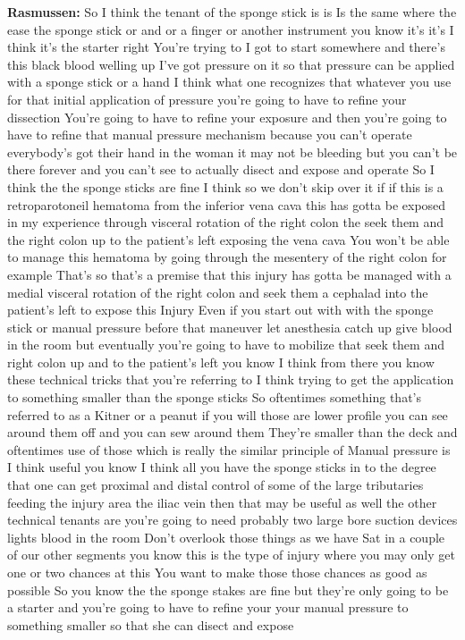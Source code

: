 \documentclass[
]{book}
\begin{document}
\textbf{Rasmussen:} So I think the tenant of the sponge stick is is Is the same where the ease the sponge stick or and or a finger or another instrument you know it's it's I think it's the starter right You're trying to I got to start somewhere and there's this black blood welling up I've got pressure on it so that pressure can be applied with a sponge stick or a hand I think what one recognizes that whatever you use for that initial application of pressure you're going to have to refine your dissection You're going to have to refine your exposure and then you're going to have to refine that manual pressure mechanism because you can't operate everybody's got their hand in the woman it may not be bleeding but you can't be there forever and you can't see to actually disect and expose and operate So I think the the sponge sticks are fine I think so we don't skip over it if if this is a retroparotoneil hematoma from the inferior vena cava this has gotta be exposed in my experience through visceral rotation of the right colon the seek them and the right colon up to the patient's left exposing the vena cava You won't be able to manage this hematoma by going through the mesentery of the right colon for example That's so that's a premise that this injury has gotta be managed with a medial visceral rotation of the right colon and seek them a cephalad into the patient's left to expose this Injury Even if you start out with with the sponge stick or manual pressure before that maneuver let anesthesia catch up give blood in the room but eventually you're going to have to mobilize that seek them and right colon up and to the patient's left you know I think from there you know these technical tricks that you're referring to I think trying to get the application to something smaller than the sponge sticks So oftentimes something that's referred to as a Kitner or a peanut if you will those are lower profile you can see around them off and you can sew around them They're smaller than the deck and oftentimes use of those which is really the similar principle of Manual pressure is I think useful you know I think all you have the sponge sticks in to the degree that one can get proximal and distal control of some of the large tributaries feeding the injury area the iliac vein then that may be useful as well the other technical tenants are you're going to need probably two large bore suction devices lights blood in the room Don't overlook those things as we have Sat in a couple of our other segments you know this is the type of injury where you may only get one or two chances at this You want to make those those chances as good as possible So you know the the sponge stakes are fine but they're only going to be a starter and you're going to have to refine your your manual pressure to something smaller so that she can disect and expose
\end{document}
